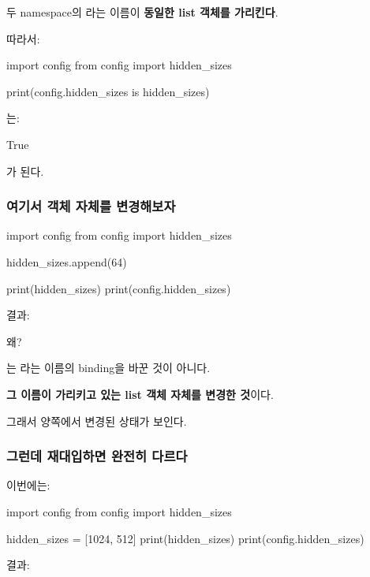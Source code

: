 두 namespace의 라는 이름이 \textbf{동일한 list 객체를 가리킨다}.

따라서:

\begin{dhkcode}
import config
from config import hidden_sizes

print(config.hidden_sizes is hidden_sizes)
\end{dhkcode}

는:

\begin{dhkzsh}
True
\end{dhkzsh}

가 된다.

\subsubsection{여기서 객체 자체를 변경해보자}

\begin{dhkcode}
import config
from config import hidden_sizes

hidden_sizes.append(64)

print(hidden_sizes)
print(config.hidden_sizes)
\end{dhkcode}

결과:

\begin{dhkzsh}
[512, 256, 128, 64]
[512, 256, 128, 64]
\end{dhkzsh}

왜?

는 라는 이름의 binding을 바꾼 것이 아니다.

\textbf{그 이름이 가리키고 있는 list 객체 자체를 변경한 것}이다.

그래서 양쪽에서 변경된 상태가 보인다.

\subsubsection{그런데 재대입하면 완전히 다르다}

이번에는:

\begin{dhkcode}
import config
from config import hidden_sizes

hidden_sizes = [1024, 512]
print(hidden_sizes)
print(config.hidden_sizes)
\end{dhkcode}

결과:

\begin{dhkzsh}
[1024, 512]
[512, 256, 128]
\end{dhkzsh}

